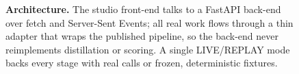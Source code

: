 \begin{figure}[t]
  \centering
  \caption{\textbf{Architecture.} The studio front-end talks to a FastAPI
    back-end over fetch and Server-Sent Events; all real work flows through
    a thin adapter that wraps the published pipeline, so the back-end never
    reimplements distillation or scoring. A single LIVE/REPLAY mode backs
    every stage with real calls or frozen, deterministic fixtures.}
  \label{fig:architecture}
\end{figure}
